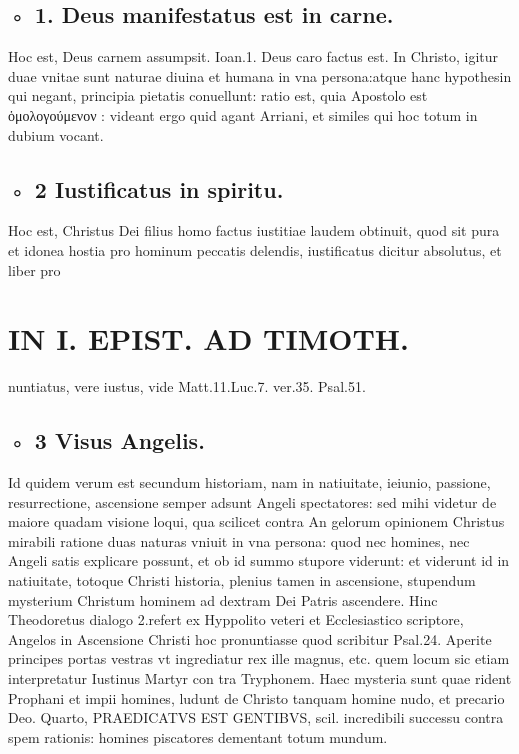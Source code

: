 \documentclass{article}
\begin{document}
\begin{pages}
\subsection*{◦      1. Deus manifestatus est in carne. }\pstart Hoc est, Deus carnem assumpsit. Ioan.1. Deus caro factus est. In Christo, igitur duae vnitae sunt naturae diuina et humana in vna persona:atque hanc hypothesin qui negant, principia pietatis conuellunt: ratio est, quia Apostolo est ὁμολογούμενον : videant ergo quid agant Arriani, et similes qui hoc totum in dubium vocant.  \pend
{}
{}
\subsection*{◦      2 Iustificatus in spiritu. }\pstart Hoc est, Christus Dei filius homo factus iustitiae laudem obtinuit, quod sit pura et idonea hostia pro hominum peccatis delendis, iustificatus dicitur absolutus, et liber pro\pend
\section*{IN I. EPIST. AD TIMOTH. }
\marginpar{[ p.81 ]}\pstart nuntiatus, vere iustus, vide Matt.11.Luc.7. ver.35. Psal.51.  \pend
{}
{}
\subsection*{◦      3 Visus Angelis. }\pstart Id quidem verum est secundum historiam, nam in natiuitate, ieiunio, passione, resurrectione, ascensione semper adsunt Angeli spectatores: sed mihi videtur de maiore quadam visione loqui, qua scilicet contra An gelorum opinionem Christus mirabili ratione duas naturas vniuit in vna persona: quod nec homines, nec Angeli satis explicare possunt, et ob id summo stupore viderunt: et viderunt id in natiuitate, totoque Christi historia, plenius tamen in ascensione, stupendum mysterium Christum hominem ad dextram Dei Patris ascendere. Hinc Theodoretus dialogo 2.refert ex Hyppolito veteri et Ecclesiastico scriptore, Angelos in Ascensione Christi hoc pronuntiasse quod scribitur Psal.24. Aperite principes portas vestras vt ingrediatur rex ille magnus, etc. quem locum sic etiam interpretatur Iustinus Martyr con tra Tryphonem. Haec mysteria sunt quae rident Prophani et impii homines, ludunt de Christo tanquam homine nudo, et precario Deo.  \pend\pstart Quarto, PRAEDICATVS EST GENTIBVS, scil. incredibili successu contra spem rationis: homines piscatores dementant totum mundum.  \pend

\end{pages}
\end{document}
